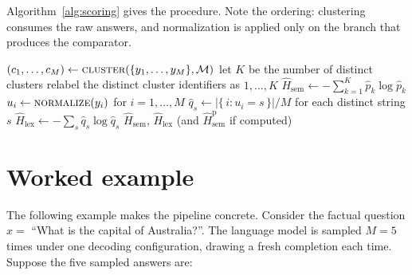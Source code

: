 Algorithm~\ref{alg:scoring} gives the procedure. Note the ordering: clustering
consumes the raw answers, and normalization is applied only on the branch that
produces the comparator.

\begin{algorithm}[htb]
\caption{Semantic-entropy scoring from sampled answers, with the
  clustering-free comparator computed from the same samples.}
\label{alg:scoring}
$(c_1,\ldots,c_M) \gets \textsc{cluster}(\{y_1,\ldots,y_M\}, \mathcal{M})$
let $K$ be the number of distinct clusters\;
relabel the distinct cluster identifiers as $1,\ldots,K$\;
$\widehat{H}_{\mathrm{sem}} \gets -\sum_{k=1}^{K}\hat{p}_k \log \hat{p}_k$
$u_i \gets \textsc{normalize}(y_i)$ for $i=1,\ldots,M$\;
$\hat{q}_s \gets |\{\,i : u_i = s\,\}| / M$ for each distinct string $s$\;
$\widehat{H}_{\mathrm{lex}} \gets -\sum_{s}\hat{q}_s \log \hat{q}_s$
\Return $\widehat{H}_{\mathrm{sem}}$, $\widehat{H}_{\mathrm{lex}}$ (and
  $\widehat{H}^{\mathrm{p}}_{\mathrm{sem}}$ if computed)\;
\end{algorithm}

\section{Worked example}
\label{sec:worked_example}

The following example makes the pipeline concrete. Consider the factual
question $x = $ ``What is the capital of Australia?''. The language model is
sampled $M=5$ times under one decoding configuration, drawing a fresh
completion each time. Suppose the five sampled answers are:

